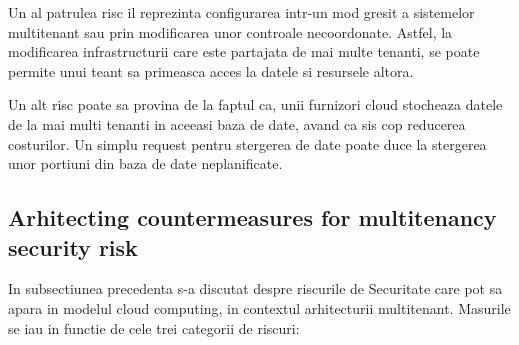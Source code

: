 \documentclass[twoside,twocolumn]{article}
\begin{document}
Un al patrulea risc il reprezinta configurarea intr-un mod gresit a sistemelor multitenant sau prin modificarea unor controale necoordonate. Astfel, la modificarea infrastructurii care este partajata de mai multe tenanti, se poate permite unui teant sa primeasca acces la datele si resursele altora. 

Un alt risc poate sa provina de la faptul ca, unii furnizori cloud stocheaza datele de la mai multi tenanti in aceeasi baza de date, avand ca sis cop reducerea costurilor. Un simplu request pentru stergerea de date poate duce la stergerea unor portiuni din baza de date neplanificate.

\subsection{Arhitecting countermeasures for multitenancy security risk}
In subsectiunea precedenta s-a discutat despre riscurile de  Securitate care pot sa apara in modelul cloud computing, in contextul arhitecturii multitenant. Masurile se iau in functie de cele trei categorii de riscuri:
\end{document}
